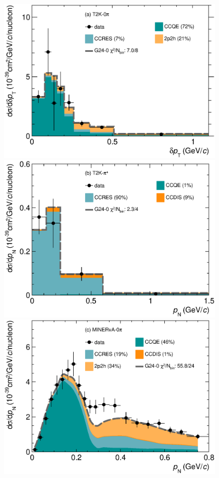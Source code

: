\begin{figure}
    \includegraphics[width=\dbfigwid\textwidth]{figures/tuning/0000-t2k_0pi_dpt_reac_decomp.eps}
    \includegraphics[width=\dbfigwid\textwidth]{figures/tuning/0000-t2k_pip_pn_reac_decomp.eps}
    \includegraphics[width=\dbfigwid\textwidth]{figures/tuning/0000-min_0pi_pn_reac_decomp.eps}

\end{figure}
